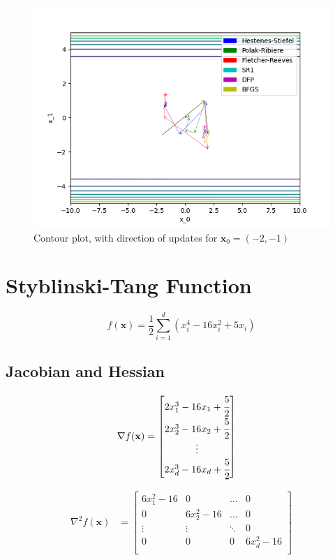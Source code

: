 \documentclass[a4paper]{article}
\begin{document}
\begin{figure}[H]
    \centering
    \includegraphics[width=.65\textwidth]{images/three_hump_camel_function_cont.png}
    \caption{Contour plot, with direction of updates for $\textbf{x}_0 = (-2, -1)$}
\end{figure}

\section{Styblinski-Tang Function}

$$f(\textbf{x}) = \frac{1}{2} \sum_{i=1}^d (x_i^4 - 16 x_i^2 + 5 x_i)$$

\subsection{Jacobian and Hessian}

\begin{align*}
\nabla f(\textbf{x}) &=
    \begin{bmatrix}
        2 x_1^3 - 16 x_1 + \cfrac{5}{2} \\
        2 x_2^3 - 16 x_2 + \cfrac{5}{2} \\
        \vdots \\
        2 x_d^3 - 16 x_d + \cfrac{5}{2} \\
    \end{bmatrix}
\end{align*}

\begin{align*}
\nabla^2 f(\textbf{x}) &=
    \begin{bmatrix}
        6 x_1^2 - 16 & 0 & \dots & 0 \\
        0 & 6 x_2^2 - 16 & \dots & 0 \\
        \vdots & \vdots & \ddots & 0 \\
        0 & 0 & 0 & 6 x_d^2 - 16 \\
    \end{bmatrix}
\end{align*}
\end{document}
